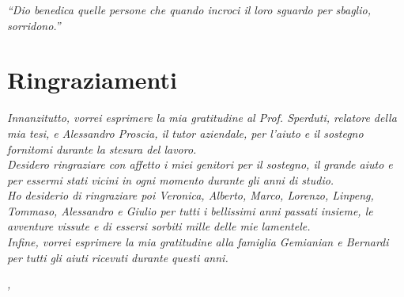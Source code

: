 
\cleardoublepage
{}
{}
\begin{flushright}{
	\slshape
	``Dio benedica quelle persone che quando incroci il loro sguardo per sbaglio, sorridono.''} \\
	\medskip
\end{flushright}


\bigskip

\begingroup
\let\clearpage\relax
\let\cleardoublepage\relax
\let\cleardoublepage\relax

\chapter*{Ringraziamenti}

\noindent \textit{Innanzitutto, vorrei esprimere la mia gratitudine al Prof. Sperduti, relatore della mia tesi, e Alessandro Proscia, il tutor aziendale, per l'aiuto e il sostegno fornitomi durante la stesura del lavoro.}\\

\noindent \textit{Desidero ringraziare con affetto i miei genitori per il sostegno, il grande aiuto e per essermi stati vicini in ogni momento durante gli anni di studio.}\\

\noindent \textit{Ho desiderio di ringraziare poi Veronica, Alberto, Marco, Lorenzo, Linpeng, Tommaso, Alessandro e Giulio per tutti i bellissimi anni passati insieme, le avventure vissute e di essersi sorbiti mille delle mie lamentele.}\\

\noindent \textit{Infine, vorrei esprimere la mia gratitudine alla famiglia Gemianian e Bernardi per tutti gli aiuti ricevuti durante questi anni.}\\
\bigskip

\noindent\textit{\myLocation, \myTime}
\hfill \myName

\endgroup

